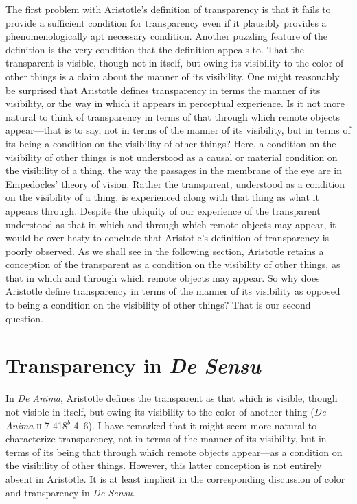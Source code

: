 \documentclass[12pt]{article}
\begin{document}
The first problem with Aristotle's definition of transparency is that it fails to provide a sufficient condition for transparency even if it plausibly provides a phenomenologically apt necessary condition. Another puzzling feature of the definition is the very condition that the definition appeals to. That the transparent is visible, though not in itself, but owing its visibility to the color of other things is a claim about the manner of its visibility.  One might reasonably be surprised that Aristotle defines transparency in terms the manner of its visibility, or the way in which it appears in perceptual experience. Is it not more natural to think of transparency in terms of that through which remote objects appear---that is to say, not in terms of the manner of its visibility, but in terms of its being a condition on the visibility of other things? Here, a condition on the visibility of other things is not understood as a causal or material condition on the visibility of a thing, the way the passages in the membrane of the eye are in Empedocles' theory of vision. Rather the transparent, understood as a condition on the visibility of a thing, is experienced along with that thing as what it appears through. Despite the ubiquity of our experience of the transparent understood as that in which and through which remote objects may appear, it would be over hasty to conclude that Aristotle's definition of transparency is poorly observed. As we shall see in the following section, Aristotle retains a conception of the transparent as a condition on the visibility of other things, as that in which and through which remote objects may appear. So why does Aristotle define transparency in terms of the manner of its visibility as opposed to being a condition on the visibility of other things? That is our second question.



\section{Transparency in \emph{De Sensu}} %
\label{sec:transparency_in_de sensu}

In \emph{De Anima}, Aristotle defines the transparent as that which is visible, though not visible in itself, but owing its visibility to the color of another thing (\emph{De Anima} \textsc{ii} 7 418\( ^{b} \) 4--6). I have remarked that it might seem more natural to characterize transparency, not in terms of the manner of its visibility, but in terms of its being that through which remote objects appear---as a condition on the visibility of other things. However, this latter conception is not entirely absent in Aristotle. It is at least implicit in the corresponding discussion of color and transparency in \emph{De Sensu}.
\end{document}
